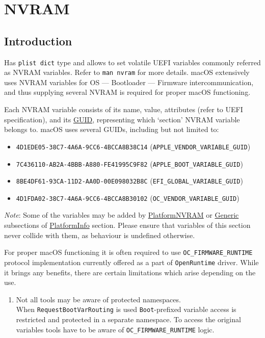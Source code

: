 \documentclass[]{article}
\makeatletter
\providecommand{\tightlist}{%
  \setlength{\itemsep}{0pt}\setlength{\parskip}{0pt}}
\renewcommand{\label}[1]{%
\zref@wrapper@immediate{\oldlabel{#1}}}  %
\makeatother
\begin{document}
\section{NVRAM}\label{nvram}

\subsection{Introduction}\label{nvramintro}

Has \texttt{plist\ dict} type and allows to set volatile UEFI variables
commonly referred as NVRAM variables. Refer to \texttt{man\ nvram} for
more details. macOS extensively uses NVRAM variables for OS --- Bootloader
--- Firmware intercommunication, and thus supplying several NVRAM is
required for proper macOS functioning.

Each NVRAM variable consists of its name, value, attributes (refer to
UEFI specification), and its
\href{https://en.wikipedia.org/wiki/Universally_unique_identifier}{GUID},
representing which `section' NVRAM variable belongs to. macOS uses
several GUIDs, including but not limited to:

\begin{itemize}
\tightlist
\item
  \texttt{4D1EDE05-38C7-4A6A-9CC6-4BCCA8B38C14}
  (\texttt{APPLE\_VENDOR\_VARIABLE\_GUID})
\item
  \texttt{7C436110-AB2A-4BBB-A880-FE41995C9F82}
  (\texttt{APPLE\_BOOT\_VARIABLE\_GUID})
\item
  \texttt{8BE4DF61-93CA-11D2-AA0D-00E098032B8C}
  (\texttt{EFI\_GLOBAL\_VARIABLE\_GUID})
\item
  \texttt{4D1FDA02-38C7-4A6A-9CC6-4BCCA8B30102}
  (\texttt{OC\_VENDOR\_VARIABLE\_GUID})
\end{itemize}

\emph{Note}: Some of the variables may be added by
\hyperref[platforminfonvram]{PlatformNVRAM} or
\hyperref[platforminfogeneric]{Generic} subsections of
\hyperref[platforminfo]{PlatformInfo} section.
Please ensure that variables of this section never collide with them,
as behaviour is undefined otherwise.

For proper macOS functioning it is often required to use \texttt{OC\_FIRMWARE\_RUNTIME}
protocol implementation currently offered as a part of \texttt{OpenRuntime} driver.
While it brings any benefits, there are certain limitations which arise depending on the
use.

\begin{enumerate}
\item Not all tools may be aware of protected namespaces.\\
  When \texttt{RequestBootVarRouting} is used \texttt{Boot}-prefixed variable access
  is restricted and protected in a separate namespace. To access the original variables
  tools have to be aware of \texttt{OC\_FIRMWARE\_RUNTIME} logic.
\end{enumerate}
\end{document}
